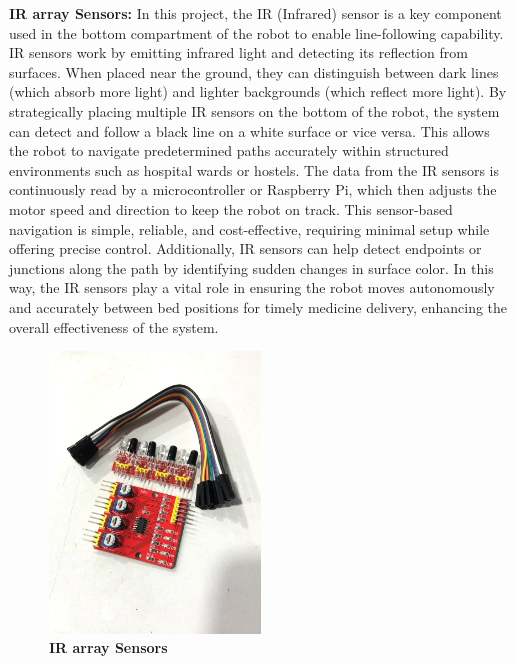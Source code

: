 \textbf{IR array Sensors: }In this project, the IR (Infrared) sensor is a key component used in the bottom compartment of the robot to enable line-following capability. IR sensors work by emitting infrared light and detecting its reflection from surfaces. When placed near the ground, they can distinguish between dark lines (which absorb more light) and lighter backgrounds (which reflect more light). By strategically placing multiple IR sensors on the bottom of the robot, the system can detect and follow a black line on a white surface or vice versa. This allows the robot to navigate predetermined paths accurately within structured environments such as hospital wards or hostels. The data from the IR sensors is continuously read by a microcontroller or Raspberry Pi, which then adjusts the motor speed and direction to keep the robot on track. This sensor-based navigation is simple, reliable, and cost-effective, requiring minimal setup while offering precise control. Additionally, IR sensors can help detect endpoints or junctions along the path by identifying sudden changes in surface color. In this way, the IR sensors play a vital role in ensuring the robot moves autonomously and accurately between bed positions for timely medicine delivery, enhancing the overall effectiveness of the system.

\begin{figure}[H]
\centering
\includegraphics[width=0.5\textwidth,height=0.5\textwidth, keepaspectratio]{images/3.4.jpg}
\caption{\textbf{IR array Sensors}}
\label{fig:3.4}
\end{figure}



\vspace{1.5\baselineskip} %

